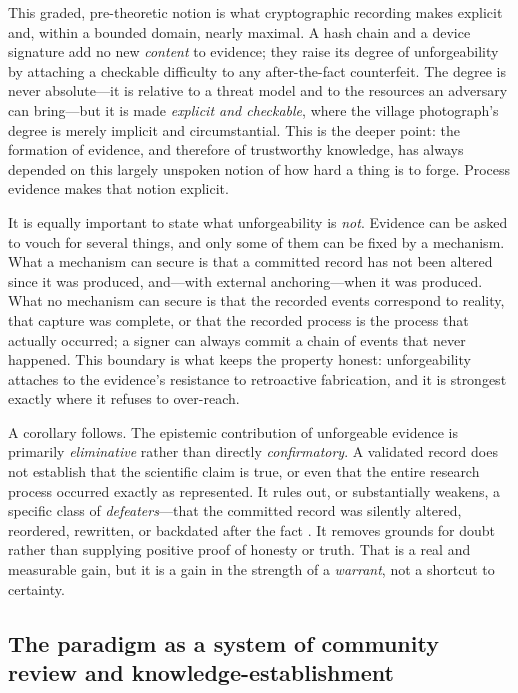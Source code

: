 \documentclass[11pt]{article}
\begin{document}
This graded, pre-theoretic notion is what cryptographic recording makes explicit and,
within a bounded domain, nearly maximal. A hash chain and a device signature add no new
\emph{content} to evidence; they raise its degree of unforgeability by attaching a
checkable difficulty to any after-the-fact counterfeit. The degree is never absolute---it
is relative to a threat model and to the resources an adversary can bring---but it is
made \emph{explicit and checkable}, where the village photograph's degree is merely
implicit and circumstantial. This is the deeper point: the formation of evidence, and
therefore of trustworthy knowledge, has always depended on this largely unspoken notion
of how hard a thing is to forge. Process evidence makes that notion explicit.

It is equally important to state what unforgeability is \emph{not}. Evidence can be
asked to vouch for several things, and only some of them can be fixed by a mechanism.
What a mechanism can secure is that a committed record has not been altered since it was
produced, and---with external anchoring---when it was produced. What no mechanism can
secure is that the recorded events correspond to reality, that capture was complete, or
that the recorded process is the process that actually occurred; a signer can always
commit a chain of events that never happened. This boundary is what keeps the property
honest: unforgeability attaches to the evidence's resistance to retroactive fabrication,
and it is strongest exactly where it refuses to over-reach.

A corollary follows. The epistemic contribution of unforgeable evidence is primarily
\emph{eliminative} rather than directly \emph{confirmatory}. A validated record does not
establish that the scientific claim is true, or even that the entire research process
occurred exactly as represented. It rules out, or substantially weakens, a specific
class of \emph{defeaters}---that the committed record was silently altered, reordered,
rewritten, or backdated after the fact \parencite{pollock1986}. It removes grounds for doubt
rather than supplying positive proof of honesty or truth. That is a real and measurable
gain, but it is a gain in the strength of a \emph{warrant}, not a shortcut to certainty.

\subsection{The paradigm as a system of community review and knowledge-establishment}
\label{sec:system}
\end{document}
